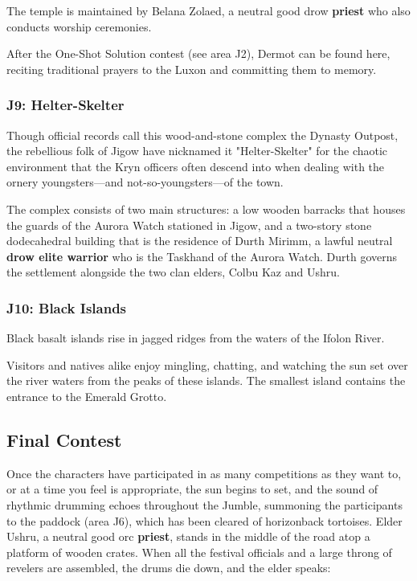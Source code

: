 \documentclass[letterpaper, 11pt, bg=full, twocolumn]{dndbook}
\begin{document}
The temple is maintained by Belana Zolaed, a neutral good drow \textbf{priest} who also conducts worship ceremonies.

After the One-Shot Solution contest (see area J2), Dermot can be found here, reciting traditional prayers to the Luxon and committing them to memory.

\subsubsection{J9: Helter-Skelter}

Though official records call this wood-and-stone complex the Dynasty Outpost, the rebellious folk of Jigow have nicknamed it "Helter-Skelter" for the chaotic environment that the Kryn officers often descend into when dealing with the ornery youngsters---and not-so-youngsters---of the town.

The complex consists of two main structures: a low wooden barracks that houses the guards of the Aurora Watch stationed in Jigow, and a two-story stone dodecahedral building that is the residence of Durth Mirimm, a lawful neutral \textbf{drow elite warrior} who is the Taskhand of the Aurora Watch. Durth governs the settlement alongside the two clan elders, Colbu Kaz and Ushru.

\subsubsection{J10: Black Islands}

\begin{DndReadAloud}
Black basalt islands rise in jagged ridges from the waters of the Ifolon River.
\end{DndReadAloud}

Visitors and natives alike enjoy mingling, chatting, and watching the sun set over the river waters from the peaks of these islands. The smallest island contains the entrance to the Emerald Grotto.

\subsection{Final Contest}

Once the characters have participated in as many competitions as they want to, or at a time you feel is appropriate, the sun begins to set, and the sound of rhythmic drumming echoes throughout the Jumble, summoning the participants to the paddock (area J6), which has been cleared of horizonback tortoises. Elder Ushru, a neutral good orc \textbf{priest}, stands in the middle of the road atop a platform of wooden crates. When all the festival officials and a large throng of revelers are assembled, the drums die down, and the elder speaks:
\end{document}
